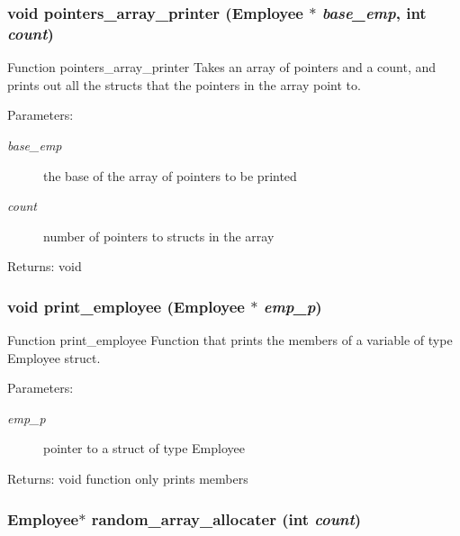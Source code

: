 \subsubsection{\setlength{\rightskip}{0pt plus 5cm}void pointers\_\-array\_\-printer (\bf{Employee} $\ast$ {\em base\_\-emp}, int {\em count})}\label{mystructs_8h_17a84f9519304b49309decd6b3d1e2dc}


Function pointers\_\-array\_\-printer Takes an array of pointers and a count, and prints out all the structs that the pointers in the array point to. \begin{Desc}
\item[Parameters:]
\begin{description}
\item[{\em base\_\-emp}]the base of the array of pointers to be printed \item[{\em count}]number of pointers to structs in the array \end{description}
\end{Desc}
\begin{Desc}
\item[Returns:]void \end{Desc}
\subsubsection{\setlength{\rightskip}{0pt plus 5cm}void print\_\-employee (\bf{Employee} $\ast$ {\em emp\_\-p})}\label{mystructs_8h_486c8a67b28b46d8b8cd96822e9c1e0e}


Function print\_\-employee Function that prints the members of a variable of type Employee struct. \begin{Desc}
\item[Parameters:]
\begin{description}
\item[{\em emp\_\-p}]pointer to a struct of type Employee \end{description}
\end{Desc}
\begin{Desc}
\item[Returns:]void function only prints members \end{Desc}
\subsubsection{\setlength{\rightskip}{0pt plus 5cm}\bf{Employee}$\ast$ random\_\-array\_\-allocater (int {\em count})}\label{mystructs_8h_b758313ac22f4427edb44f1a43321cba}


